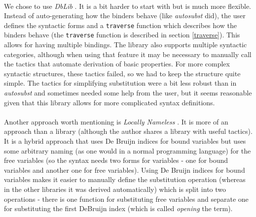 \documentclass[runningheads]{article}
\begin{document}

\paragraph{}

We chose to use \textit{DbLib} \cite{dblib}. It is a bit harder to start with but is much more flexible. Instead of auto-generating how the binders behave (like \textit{autosubst} did), the user defines the syntactic forms and a \verb|traverse| function which describes how the binders behave (the \verb|traverse| function is described in section \ref{traverse}). This allows for having multiple bindings. The library also supports multiple syntactic categories, although when using that feature it may be necessary to manually call the tactics that automate derivation of basic properties. For more complex syntactic structures, these tactics failed, so we had to keep the structure quite simple. The tactics for simplifying substitution were a bit less robust than in \textit{autosubst} and sometimes needed some help from the user, but it seems reasonable given that this library allows for more complicated syntax definitions.

\paragraph{}

Another approach worth mentioning is \textit{Locally Nameless} \cite{locallynameless}. It is more of an approach than a library (although the author shares a library with useful tactics). It is a hybrid approach that uses De Bruijn indices for bound variables but uses some arbitrary naming (as one would in a normal programming language) for the free variables (so the syntax needs two forms for variables - one for bound variables and another one for free variables). Using De Bruijn indices for bound variables makes it easier to manually define the substitution operation (whereas in the other libraries it was derived automatically) which is split into two operations - there is one function for substituting free variables and separate one for substituting the first DeBruijn index (which is called \textit{opening} the term). 
\end{document}
